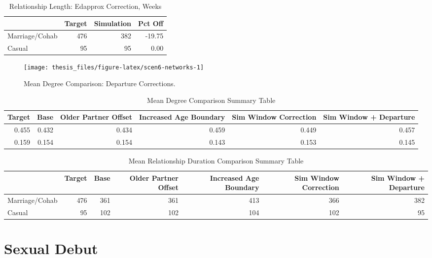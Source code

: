 \documentclass [11pt, proquest] {uwthesis}[2015/03/03]
\begin{document}
\begin{table}

\caption{\label{tab:scen6-duration}Relationship Length: Edapprox Correction, Weeks}
\centering
\begin{tabular}[t]{lrrr}
\toprule
  & Target & Simulation & Pct Off\\
\midrule
Marriage/Cohab & 476 & 382 & -19.75\\
Casual & 95 & 95 & 0.00\\
\bottomrule
\end{tabular}
\end{table}
\begin{figure}

{\centering \texttt{[image: thesis\_files/figure-latex/scen6-networks-1]} 

}

\caption{Mean Degree Comparison: Departure Corrections.}\label{fig:scen6-networks}
\end{figure}
\begin{table}

\caption{\label{tab:summary-table}Mean Degree Comparison Summary Table}
\centering
\begin{tabular}[t]{rrrrrr}
\toprule
Target & Base & Older Partner Offset & Increased Age Boundary & Sim Window Correction & Sim Window + Departure\\
\midrule
0.455 & 0.432 & 0.434 & 0.459 & 0.449 & 0.457\\
0.159 & 0.154 & 0.154 & 0.143 & 0.153 & 0.145\\
\bottomrule
\end{tabular}
\end{table}
\begin{table}

\caption{\label{tab:summary-durs}Mean Relationship Duration Comparison Summary Table}
\centering
\begin{tabular}[t]{lrrrrrr}
\toprule
  & Target & Base & Older Partner Offset & Increased Age Boundary & Sim Window Correction & Sim Window + Departure\\
\midrule
Marriage/Cohab & 476 & 361 & 361 & 413 & 366 & 382\\
Casual & 95 & 102 & 102 & 104 & 102 & 95\\
\bottomrule
\end{tabular}
\end{table}
\section{Sexual Debut}\label{sexual-debut}
\end{document}
